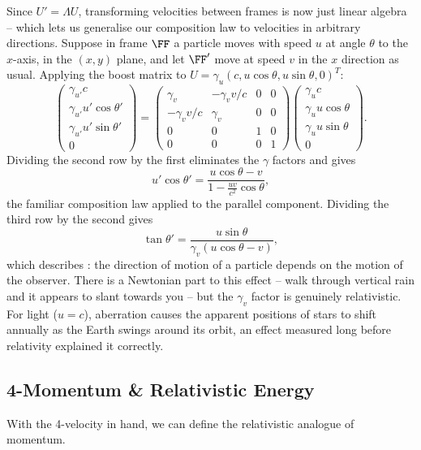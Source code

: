 Since $U' = \Lambda U$, transforming velocities between frames is now just linear algebra -- which lets us generalise our composition law to velocities in arbitrary directions. Suppose in frame $\FF$ a particle moves with speed $u$ at angle $\theta$ to the $x$-axis, in the $(x,y)$ plane, and let $\FF'$ move at speed $v$ in the $x$ direction as usual. Applying the boost matrix to $U = \gamma_u(c, u\cos\theta, u \sin\theta, 0)^T$:
$$
\begin{pmatrix}
	\gamma_{u'} c \\ \gamma_{u'} u' \cos\theta' \\ \gamma_{u'} u' \sin \theta' \\ 0
\end{pmatrix} = \begin{pmatrix}
	\gamma_v & -\gamma_v v/c & 0 & 0 \\
	-\gamma_v v/c & \gamma_v & 0 & 0 \\
	0 & 0 & 1 & 0 \\
	0 & 0 & 0 & 1
\end{pmatrix}\begin{pmatrix}
	\gamma_u c \\ \gamma_u u \cos\theta \\ \gamma_u u \sin\theta \\ 0
\end{pmatrix}.
$$
Dividing the second row by the first eliminates the $\gamma$ factors and gives
$$
u' \cos \theta' = \frac{u \cos\theta - v}{1 - \frac{uv}{c^2}\cos\theta},
$$
the familiar composition law applied to the parallel component. Dividing the third row by the second gives
$$
\tan \theta' = \frac{u \sin \theta}{\gamma_v (u \cos\theta - v)},
$$
which describes : the direction of motion of a particle depends on the motion of the observer. There is a Newtonian part to this effect -- walk through vertical rain and it appears to slant towards you -- but the $\gamma_v$ factor is genuinely relativistic. For light ($u = c$), aberration causes the apparent positions of stars to shift annually as the Earth swings around its orbit, an effect measured long before relativity explained it correctly.

\subsection{4-Momentum \& Relativistic Energy}

With the 4-velocity in hand, we can define the relativistic analogue of momentum.

